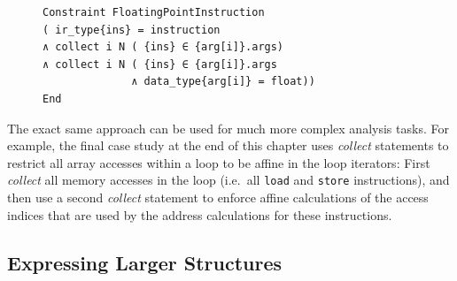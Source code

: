 \begin{figure}[H]
\begin{lstlisting}[language=CAnDL,label={fig:collectexample},caption=
   {{\it Collect} is used to restrict {\tt ins} to be calculated exclusively
    from floating point values.\leftskip=0pt\rightskip=0pt}]
Constraint FloatingPointInstruction
( ir_type{ins} = instruction
∧ collect i N ( {ins} ∈ {arg[i]}.args)
∧ collect i N ( {ins} ∈ {arg[i]}.args
              ∧ data_type{arg[i]} = float))
End
\end{lstlisting}
\end{figure}

    The exact same approach can be used for much more complex analysis tasks.
    For example, the final case study at the end of this chapter uses
    {\it collect} statements to restrict all array accesses within a
    loop to be affine in the loop iterators:
    First {\it collect} all memory accesses in the loop
    (i.e.\ all \texttt{load} and \texttt{store} instructions), and then use a
    second {\it collect} statement to enforce affine calculations of the access
    indices that are used by the address calculations for these instructions.

\subsection{Expressing Larger Structures}


